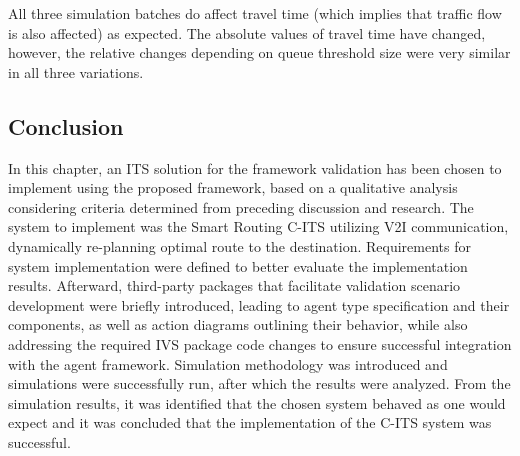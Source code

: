 \documentclass[main.tex]{subfiles}
\begin{document}
All three simulation batches do affect travel time (which implies that traffic flow 
is also affected) as expected. The absolute values of travel time have changed, however, 
the relative changes depending on queue threshold size were very similar in all three 
variations.

\clearpage 

\subsection{Conclusion}

In this chapter, an ITS solution for the framework validation has been chosen to implement
using the proposed framework, based on a qualitative analysis considering criteria determined
from preceding discussion and research. The system to implement was the Smart Routing C-ITS
utilizing V2I communication, dynamically re-planning optimal route to the destination. Requirements
for system implementation were defined to better evaluate the implementation results.
Afterward, third-party packages that facilitate validation scenario development were briefly
introduced, leading to agent type specification and their components, as well as
action diagrams outlining their behavior, while also addressing the required IVS package code
changes to ensure successful integration with the agent framework. Simulation methodology was
introduced and simulations were successfully run, after which the results were analyzed. From the 
simulation results, it was identified that the chosen system behaved as one would expect and it
was concluded that the implementation of the C-ITS system was successful. 
\end{document}
